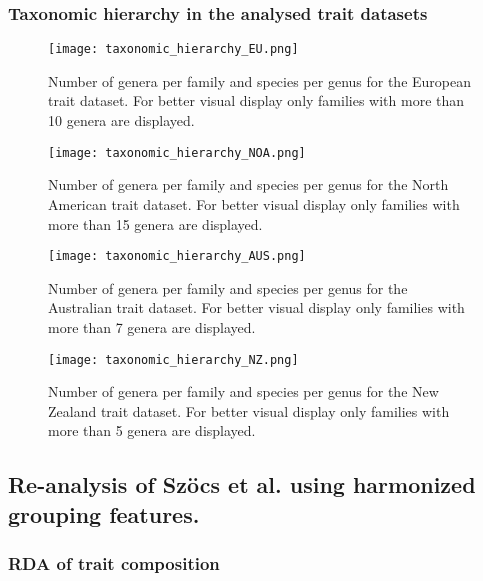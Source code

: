 \documentclass[../Draft_harmonization_paper.tex]{subfiles}
\begin{document}
\subsubsection*{Taxonomic hierarchy in the analysed trait datasets}

\begin{figure}[H]
    \centering
    \texttt{[image: taxonomic\_hierarchy\_EU.png]}
    \caption{Number of genera per family and species per genus for the European trait dataset. For better visual display only families with more than 10 genera are displayed.}
    \label{fig:tax_hierarchy_EU}
\end{figure}

\begin{figure}[H]
    \centering
    \texttt{[image: taxonomic\_hierarchy\_NOA.png]}
    \caption{Number of genera per family and species per genus for the North American trait dataset. For better visual display only families with more than 15 genera are displayed.}
    \label{fig:tax_hierarchy_NOA}
\end{figure}

\begin{figure}[H]
    \centering
    \texttt{[image: taxonomic\_hierarchy\_AUS.png]}
    \caption{Number of genera per family and species per genus for the Australian trait dataset. For better visual display only families with more than 7 genera are displayed.}
    \label{fig:tax_hierarchy_AUS}
\end{figure}

\begin{figure}[H]
    \centering
    \texttt{[image: taxonomic\_hierarchy\_NZ.png]}
    \caption{Number of genera per family and species per genus for the New Zealand trait dataset. For better visual display only families with more than 5 genera are displayed.}
    \label{fig:tax_hierarchy_NZ}
\end{figure}

\newpage

\subsection*{Re-analysis of Szöcs et al. using harmonized grouping features.}
\label{subsec:SI_szoecs_reanalysis}

\subsubsection*{RDA of trait composition}
\end{document}
